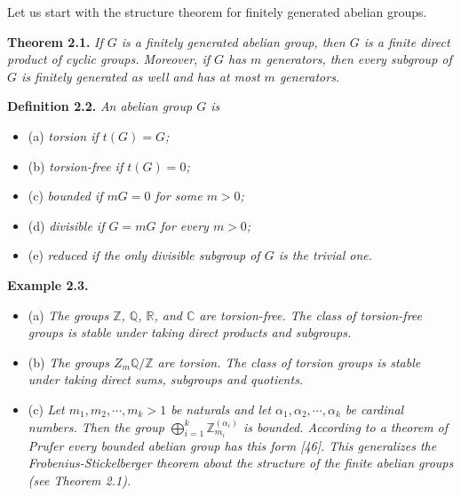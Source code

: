 \documentclass[12pt]{article}
\begin{document}
    Let us start with the structure theorem for finitely generated abelian groups.


\textbf{Theorem 2.1.} \emph{If $ G $ is a finitely generated abelian group, then $ G $ is a finite direct product of cyclic groups.
Moreover, if $ G $ has $ m $ generators, then every subgroup of $ G $ is finitely generated as well and has at most $ m $
generators.}


\textbf{Definition 2.2.} \emph{An abelian group $G$ is}

    \begin{itemize}

        \item (a) \emph{torsion if $t(G) = G$;}
    
        \item (b) \emph{torsion-free if $t(G) = 0$;}
    
        \item (c) \emph{bounded if $mG = 0$ for some $m > 0$;}
    
        \item (d) \emph{divisible if $G = mG$ for every $m > 0$;}
        
        \item (e) \emph{reduced if the only divisible subgroup of $G$ is the trivial one.}
    
    \end{itemize}


\textbf{Example 2.3.}


    \begin{itemize}

        \item (a) \emph{The groups $ \mathbb{Z} $, $ \mathbb{Q} $, $ \mathbb{R} $, and $ \mathbb{C} $ are torsion-free. The class of torsion-free groups is stable
        under taking direct products and subgroups.}

        \item (b) \emph{The groups $Z_m \mathbb{Q} / \mathbb{Z}$ are torsion. The class of torsion groups is stable under taking direct sums, subgroups
        and quotients.}

        \item (c) \emph{ Let $m_1, m_2, \dotsb , m_k > 1$ be naturals and let $\alpha_1, \alpha_2, \dotsb , \alpha_k$ be cardinal numbers. Then the group $ \bigoplus^{k}_{i=1} \mathbb{Z}^{(\alpha_{i})}_{m_{i}} $
        is bounded. According to a theorem of Prufer every bounded abelian group has this form [46]. This generalizes the Frobenius-Stickelberger theorem about the structure of the finite abelian groups (see Theorem
        2.1).}

    \end{itemize}
\end{document}
